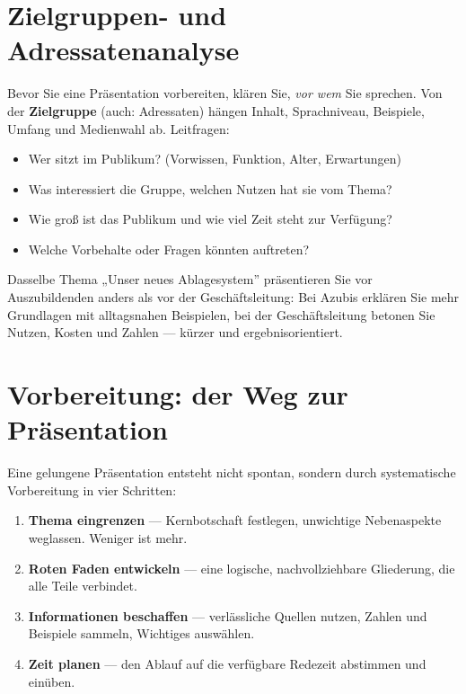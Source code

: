 \documentclass[11pt, a4paper]{article}
\begin{document}
\section{Zielgruppen- und Adressatenanalyse}

Bevor Sie eine Präsentation vorbereiten, klären Sie, \emph{vor wem} Sie sprechen. Von der
\textbf{Zielgruppe} (auch: Adressaten) hängen Inhalt, Sprachniveau, Beispiele, Umfang und
Medienwahl ab. Leitfragen:

\begin{itemize}
  \item Wer sitzt im Publikum? (Vorwissen, Funktion, Alter, Erwartungen)
  \item Was interessiert die Gruppe, welchen Nutzen hat sie vom Thema?
  \item Wie groß ist das Publikum und wie viel Zeit steht zur Verfügung?
  \item Welche Vorbehalte oder Fragen könnten auftreten?
\end{itemize}

\begin{beispiel}
Dasselbe Thema „Unser neues Ablagesystem” präsentieren Sie vor Auszubildenden anders als
vor der Geschäftsleitung: Bei Azubis erklären Sie mehr Grundlagen mit alltagsnahen
Beispielen, bei der Geschäftsleitung betonen Sie Nutzen, Kosten und Zahlen --- kürzer und
ergebnisorientiert.
\end{beispiel}

\section{Vorbereitung: der Weg zur Präsentation}

Eine gelungene Präsentation entsteht nicht spontan, sondern durch systematische
Vorbereitung in vier Schritten:

\begin{enumerate}
  \item \textbf{Thema eingrenzen} --- Kernbotschaft festlegen, unwichtige Nebenaspekte weglassen. Weniger ist mehr.
  \item \textbf{Roten Faden entwickeln} --- eine logische, nachvollziehbare Gliederung, die alle Teile verbindet.
  \item \textbf{Informationen beschaffen} --- verlässliche Quellen nutzen, Zahlen und Beispiele sammeln, Wichtiges auswählen.
  \item \textbf{Zeit planen} --- den Ablauf auf die verfügbare Redezeit abstimmen und einüben.
\end{enumerate}
\end{document}
